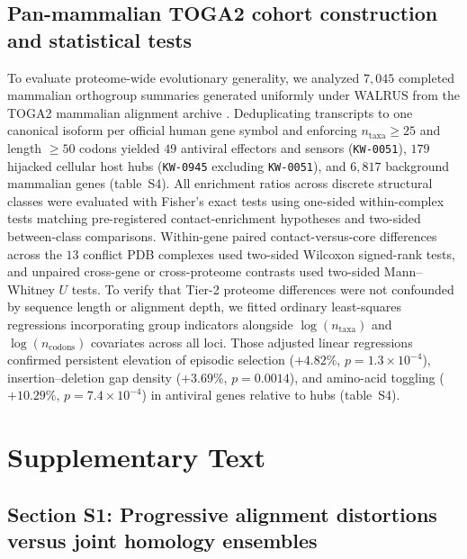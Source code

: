 \documentclass[12pt]{article}
\begin{document}
\subsection*{Pan-mammalian TOGA2 cohort construction and statistical tests}

To evaluate proteome-wide evolutionary generality, we analyzed $7,045$ completed mammalian orthogroup summaries generated uniformly under WALRUS from the TOGA2 mammalian alignment archive \cite{kirilenko2023integrating,kosakovsky2026walrus}. Deduplicating transcripts to one canonical isoform per official human gene symbol and enforcing $n_{\text{taxa}} \ge 25$ and length $\ge 50$ codons yielded $49$ antiviral effectors and sensors (\texttt{KW-0051}), $179$ hijacked cellular host hubs (\texttt{KW-0945} excluding \texttt{KW-0051}), and $6,817$ background mammalian genes (table~S4). All enrichment ratios across discrete structural classes were evaluated with Fisher's exact tests using one-sided within-complex tests matching pre-registered contact-enrichment hypotheses and two-sided between-class comparisons. Within-gene paired contact-versus-core differences across the $13$ conflict PDB complexes used two-sided Wilcoxon signed-rank tests, and unpaired cross-gene or cross-proteome contrasts used two-sided Mann--Whitney $U$ tests. To verify that Tier-2 proteome differences were not confounded by sequence length or alignment depth, we fitted ordinary least-squares regressions incorporating group indicators alongside $\log(n_{\text{taxa}})$ and $\log(n_{\text{codons}})$ covariates across all loci. Those adjusted linear regressions confirmed persistent elevation of episodic selection ($+4.82\%$, $p = 1.3 \times 10^{-4}$), insertion--deletion gap density ($+3.69\%$, $p = 0.0014$), and amino-acid toggling ($+10.29\%$, $p = 7.4 \times 10^{-4}$) in antiviral genes relative to hubs (table~S4).

\section*{Supplementary Text}

\subsection*{Section S1: Progressive alignment distortions versus joint homology ensembles}
\end{document}

